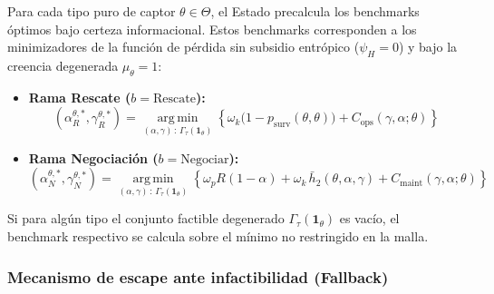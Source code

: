 \documentclass[ecta,nameyear,draft]{econsocart}
\begin{document}
Para cada tipo puro de captor $\theta \in \Theta$, el Estado precalcula los benchmarks óptimos bajo certeza informacional. Estos benchmarks corresponden a los minimizadores de la función de pérdida sin subsidio entrópico ($\psi_H = 0$) y bajo la creencia degenerada $\mu_\theta = 1$:
\begin{itemize}
    \item \textbf{Rama Rescate ($b = \text{Rescate}$):}
    \begin{equation}
    (\alpha_R^{\theta,\ast}, \gamma_R^{\theta,\ast}) = \operatorname*{arg\,min}_{(\alpha,\gamma) \,:\, \Gamma_\tau(\mathbf{1}_\theta)} \left\{ \omega_k\bigl(1 - p_{\mathrm{surv}}(\theta,\theta)\bigr) + C_{\mathrm{ops}}(\gamma,\alpha;\theta) \right\}
    \end{equation}
    \item \textbf{Rama Negociación ($b = \text{Negociar}$):}
    \begin{equation}
    (\alpha_N^{\theta,\ast}, \gamma_N^{\theta,\ast}) = \operatorname*{arg\,min}_{(\alpha,\gamma) \,:\, \Gamma_\tau(\mathbf{1}_\theta)} \left\{ \omega_p R(1-\alpha) + \omega_k\,\bar h_2(\theta,\alpha,\gamma) + C_{\mathrm{maint}}(\gamma,\alpha;\theta) \right\}
    \end{equation}
\end{itemize}
Si para algún tipo el conjunto factible degenerado $\Gamma_\tau(\mathbf{1}_\theta)$ es vacío, el benchmark respectivo se calcula sobre el mínimo no restringido en la malla.

\subsubsection*{Mecanismo de escape ante infactibilidad (Fallback)}
\end{document}
